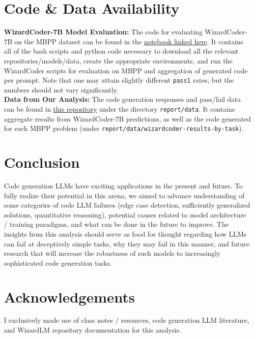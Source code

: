 \documentclass[10pt]{article}
\newcommand{\code}[1]{\texttt{#1}}
\theoremstyle{definition}
\begin{document}
\section{Code \& Data Availability}
\noindent\textbf{WizardCoder-7B Model Evaluation:} The code for evaluating WizardCoder-7B on the MBPP dataset can be found in the \href{https://colab.research.google.com/drive/1h_GR9C5uA2uJORi7ZhAuGsKP4tWUkY4Z?usp=sharing}{notebook linked here}. It contains all of the bash scripts and python code necessary to download all the relevant repositories/models/data, create the appropriate environments, and run the WizardCoder scripts for evaluation on MBPP and aggregation of generated code per prompt. Note that one may attain slightly different \code{pass1} rates, but the numbers should not vary significantly.\\

\noindent\textbf{Data from Our Analysis:} The code generation responses and pass/fail data can be found in \href{https://github.com/0xArsi/cse256_analysis_study.git}{this repository} under the directory \code{report/data}. It contains aggregate results from WizardCoder-7B predictions, as well as the code generated for each MBPP problem (under \code{report/data/wizardcoder-results-by-task}).

\section{Conclusion}
\noindent Code generation LLMs have exciting applications in the present and future. To fully realize their potential in this arena, we aimed to advance understanding of some categories of code LLM failures (edge case detection, sufficiently generalized solutions, quantitative reasoning), potential causes related to model architecture / training paradigms, and what can be done in the future to improve. The insights from this analysis should serve as food for thought regarding how LLMs can fail at deceptively simple tasks, why they may fail in this manner, and future research that will increase the robustness of such models to increasingly sophisticated code generation tasks.



\section{Acknowledgements}
\noindent I exclusively made use of class notes / resources, code generation LLM literature, and WizardLM repository documentation for this analysis.


\end{document}
